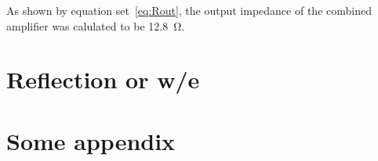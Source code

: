 \documentclass[a4paper,11pt]{article}
\begin{document}
            As shown by equation set~\ref{eq:Rout}, the output impedance of the combined amplifier was calulated to be \SI{12.8}{\ohm}.

\newpage
\section{Reflection or w/e}

\newpage
\begin{appendices}
    \label{appendix}
    \section{Some appendix}
    \label{app:one}
\end{appendices}



\end{document}
